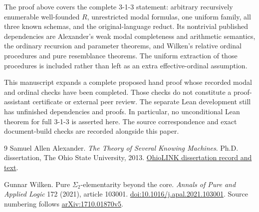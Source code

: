 \documentclass[11pt]{article}
\begin{document}
The proof above covers the complete 3-1-3 statement: arbitrary
recursively enumerable well-founded $R$, unrestricted modal formulas,
one uniform family, all three known schemas, and the original-language
reduct. Its nontrivial published dependencies are Alexander's weak
modal completeness and arithmetic semantics, the ordinary recursion
and parameter theorems, and Wilken's relative ordinal procedures and
pure resemblance theorems. The uniform extraction of those procedures
is included rather than left as an extra effective-ordinal assumption.

This manuscript expands a complete proposed hand proof whose recorded
modal and ordinal checks have been completed. Those checks do not
constitute a proof-assistant certificate or external peer review.
The separate Lean development still has unfinished dependencies and
proofs. In particular, no unconditional Lean theorem for full 3-1-3
is asserted here. The source correspondence and exact document-build
checks are recorded alongside this paper.

\begin{thebibliography}{9}
Samuel Allen Alexander.
\emph{The Theory of Several Knowing Machines}.
Ph.D. dissertation, The Ohio State University, 2013.
\href{https://etd.ohiolink.edu/acprod/odb_etd/ws/send_file/send?accession=osu1366362999\&disposition=inline}{OhioLINK dissertation record and text}.

Gunnar Wilken.
Pure $\Sigma_2$-elementarity beyond the core.
\emph{Annals of Pure and Applied Logic} 172 (2021), article 103001.
\href{https://doi.org/10.1016/j.apal.2021.103001}{doi:10.1016/j.apal.2021.103001}.
Source numbering follows
\href{https://arxiv.org/abs/1710.01870v5}{arXiv:1710.01870v5}.
\end{thebibliography}
\end{document}
